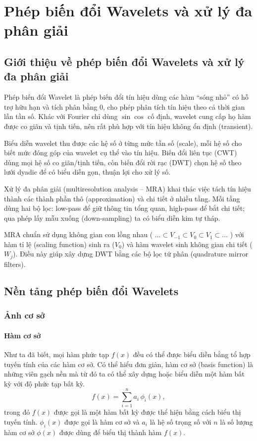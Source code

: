 \documentclass[12pt, a4paper]{report}
\begin{document}
\tableofcontents


\chapter{Phép biến đổi Wavelets và xử lý đa phân giải}
\section{Giới thiệu về phép biến đổi Wavelets và xử lý đa phân giải} 

Phép biến đổi Wavelet là phép biến đổi tín hiệu dùng các hàm “sóng nhỏ” có hỗ trợ hữu hạn và tích phân bằng 0, cho phép phân tích tín hiệu theo cả thời gian lẫn tần số. Khác với Fourier chỉ dùng $\sin \cos$ cố định, wavelet cung cấp họ hàm được co giãn và tịnh tiến, nên rất phù hợp với tín hiệu không ổn định (transient).

Biểu diễn wavelet thu được các hệ số ở từng mức tần số (scale), mỗi hệ số cho biết mức đóng góp của wavelet cụ thể vào tín hiệu. Biến đổi liên tục (CWT) dùng mọi hệ số co giãn/tịnh tiến, còn biến đổi rời rạc (DWT) chọn hệ số theo lưới dyadic để có biểu diễn gọn, thuận lợi cho xử lý số.

Xử lý đa phân giải (multiresolution analysis – MRA) khai thác việc tách tín hiệu thành các thành phần thô (approximation) và chi tiết ở nhiều tầng. Mỗi tầng dùng hai bộ lọc: low-pass để giữ thông tin tổng quan, high-pass để bắt chi tiết; qua phép lấy mẫu xuống (down-sampling) ta có biểu diễn kim tự tháp.

MRA chuẩn sử dụng không gian con lồng nhau ( $\dots \subset V_{-1} \subset V_0 \subset V_1 \subset \dots$ ) với hàm tỉ lệ (scaling function) sinh ra ($V_0$) và hàm wavelet sinh không gian chi tiết ($W_j$). Điều này giúp xây dựng DWT bằng các bộ lọc tứ phân (quadrature mirror filters).


\section{Nền tảng phép biến đổi Wavelets}

\subsection{Ảnh cơ sở}
\subsubsection*{Hàm cơ sở}

Như ta đã biết, mọi hàm phức tạp $f(x)$ đều có thể được biểu diễn bằng tổ hợp tuyến tính của các hàm cơ sở. Có thể hiểu đơn giản, hàm cơ sở (basis function) là những viên gạch nền mà từ đó ta có thể xây dựng hoặc biểu diễn một hàm bất kỳ với độ phức tạp bất kỳ.
\begin{equation}
    f(x) = \sum_{i=1}^{n} a_i \,\phi_i(x),
\end{equation}
trong đó $f(x)$ được gọi là một hàm bất kỳ được thể hiện bằng cách biểu thị tuyến tính. $\phi_i(x)$ được gọi là hàm cơ sở và $a_i$ là hệ số trọng số với $n$ là số lượng hàm cơ sở $\phi(x)$ được dùng để biểu thị thành hàm $f(x)$.
\end{document}
